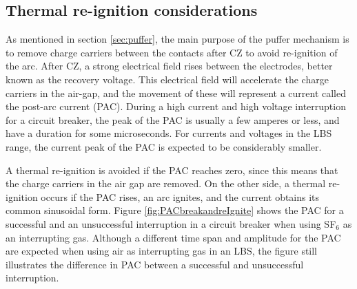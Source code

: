 \documentclass[10pt,b5paper,twoside]{article}
\begin{document}
\subsection{Thermal re-ignition considerations} \label{sec:TherMalReConsid}
As mentioned in section \ref{sec:puffer}, the main purpose of the puffer mechanism is to remove charge carriers between the contacts after CZ to avoid re-ignition of the arc. After CZ, a strong electrical field rises between the electrodes, better known as the recovery voltage. This electrical field will accelerate the charge carriers in the air-gap, and the movement of these will represent a current called the post-arc current (PAC). During a high current and high voltage interruption for a circuit breaker, the peak of the PAC is usually a few amperes or less, and have a duration for some microseconds. For currents and voltages in the LBS range, the current peak of the PAC is expected to be considerably smaller.

A thermal re-ignition is avoided if the PAC reaches zero, since this means that the charge carriers in the air gap are removed. On the other side, a thermal re-ignition occurs if the PAC rises, an arc ignites, and the current obtains its common sinusoidal form. Figure \ref{fig:PACbreakandreIgnite} shows the PAC for a successful and an unsuccessful interruption in a circuit breaker when using SF$_6$ as an interrupting gas. Although a different time span and amplitude for the PAC are expected when using air as interrupting gas in an LBS, the figure still illustrates the difference in PAC between a successful and unsuccessful interruption.
\end{document}
